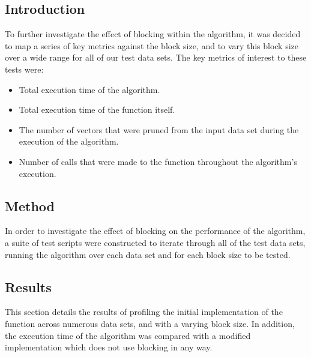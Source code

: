 \subsection{Introduction}
\label{profiling:blockSize:introduction}
To further investigate the effect of blocking within the
 algorithm, it was decided to map a series
of key metrics against the block size, and to vary this block size over a wide
range for all of our test data sets. The key metrics of interest to these tests
were:
\begin{itemize}
    \item Total execution time of the  algorithm.
    \item Total execution time of the 
        function itself.
    \item The number of vectors that were pruned from the input data set
        during the execution of the algorithm.
    \item Number of calls that were made to the 
        function throughout the algorithm's execution.
\end{itemize}

\subsection{Method}
\label{profiling:blockSize:method}
In order to investigate the effect of blocking on the performance of the
 algorithm, a suite of test scripts were
constructed to iterate through all of the test data sets, running the
 algorithm over each data set
and for each block size to be tested.

\subsection{Results}
\label{profiling:blockSize:results}
This section details the results of profiling the initial 
implementation of the  function across
numerous data sets, and with a varying block size. In addition, the execution
time of the algorithm was compared with a modified implementation which does not
use blocking in any way.

